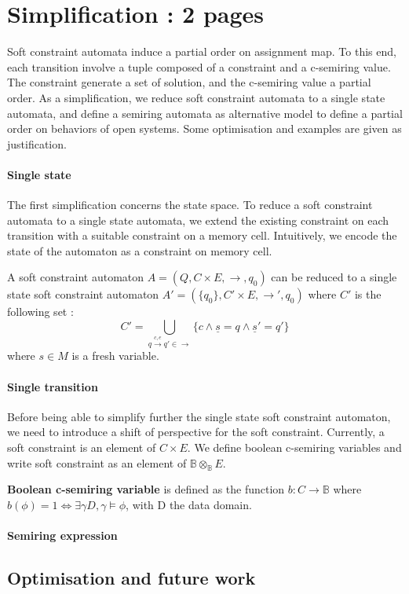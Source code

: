 \section{Simplification : 2 pages}
Soft constraint automata induce a partial order on assignment map. To this end, each transition involve a tuple composed of a constraint and a c-semiring value. The constraint generate a set of solution, and the c-semiring value a partial order. As a simplification, we reduce soft constraint automata to a single state automata, and define a semiring automata as alternative model to define a partial order on behaviors of open systems. Some optimisation and examples are given as justification.

\paragraph{Single state} The first simplification concerns the state space. To reduce a soft constraint automata to a single state automata, we extend the existing constraint on each transition with a suitable constraint on a memory cell. Intuitively, we encode the state of the automaton as a constraint on memory cell.

\begin{theorem}
	A soft constraint automaton $A =(Q,C\times E, \rightarrow, q_0)$ can be reduced to a single state soft constraint automaton $A' = (\{q_0\}, C'\times E, \rightarrow', q_0)$ where $C'$ is the following set :
		$$C' = \bigcup\limits_{q\xrightarrow{c,e}q' \in \rightarrow} \{c \land \underline{s}=q \land \underline{s}'=q'\}$$
		where $s \in M$ is a fresh variable.
	
\end{theorem}

\paragraph{Single transition} Before being able to simplify further the single state soft constraint automaton, we need to introduce a shift of perspective for the soft constraint. Currently, a soft constraint is an element of $C \times E$. We define boolean c-semiring variables and write soft constraint as an element of $\mathbb{B} \otimes_{\mathbb{B}} E$.

\begin{definition} \textbf{Boolean c-semiring variable} is defined as the function $b : C \rightarrow \mathbb{B}$ where $b(\phi) = 1 \Leftrightarrow \exists \gamma D,\gamma \models \phi$, with D the data domain.
\end{definition}
	


\paragraph{Semiring expression}
\subsection*{Optimisation and future work}